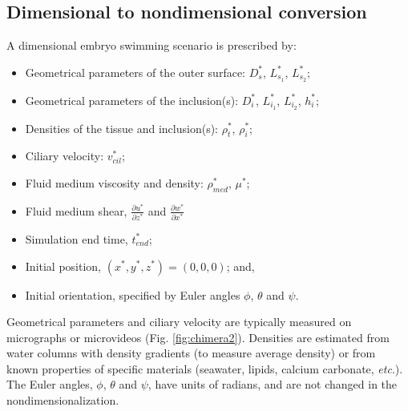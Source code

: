 \documentclass[10pt,a4paper]{article}
\def\p{\partial}
\def\etc{\emph{etc}.\xspace}
\begin{document}
\subsection{Dimensional to nondimensional conversion}
A dimensional embryo swimming scenario is prescribed by:
\begin{itemize}
	\item Geometrical parameters of the outer surface: $D^*_s$, $L^*_{s_1}$, $L^*_{s_2}$; 
	\item Geometrical parameters of the inclusion(s): $D^*_{i}$, $L^*_{i_1}$, $L^*_{i_2}$, $h^*_i$; 
	\item Densities of the tissue and inclusion(s): $\rho^*_t$, $\rho^*_{i}$; 
	\item Ciliary velocity: $v^*_{cil}$;
	\item Fluid medium viscosity and density: $\rho^*_{med}$, $\mu^*$;
	\item Fluid medium shear, $\frac{\p u^*}{\p z^*}$ and $\frac{\p w^*}{\p x^*}$
	\item Simulation end time, $t^*_{end}$;
	\item Initial position, $(x^*, y^*, z^*) = (0,0,0)$; and,
	\item Initial orientation, specified by Euler angles $\phi$, $\theta$ and $\psi$. 
\end{itemize}
Geometrical parameters and ciliary velocity are typically measured on micrographs or microvideos (Fig. \ref{fig:chimera2}).
Densities are estimated from water columns with density gradients (to measure average density) or from known properties of specific materials (seawater, lipids, calcium carbonate, \etc). 
The Euler angles, $\phi$, $\theta$ and $\psi$,  have units of radians, and are not changed in the nondimensionalization.
\end{document}
